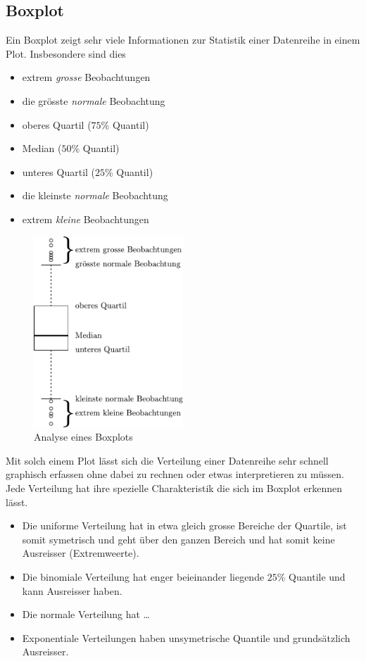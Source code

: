 \subsection{Boxplot}
Ein Boxplot zeigt sehr viele Informationen zur Statistik einer 
Datenreihe in einem Plot. Insbesondere sind dies
\begin{itemize}
	\item extrem \emph{grosse} Beobachtungen
	\item die grösste \emph{normale} Beobachtung
	\item oberes Quartil ($75$\% Quantil)
	\item Median ($50$\% Quantil)
	\item unteres Quartil ($25$\% Quantil)
	\item die kleinste \emph{normale} Beobachtung
	\item extrem \emph{kleine} Beobachtungen
\end{itemize}

\begin{figure}[h!]
	\centering
	\includegraphics[width=0.5\textwidth]{boxplot.pdf}
	\caption{Analyse eines Boxplots}
\end{figure}

\noindent
Mit solch einem Plot lässt sich die Verteilung einer Datenreihe sehr
schnell graphisch erfassen ohne dabei zu rechnen oder etwas 
interpretieren zu müssen. Jede Verteilung hat ihre spezielle 
Charakteristik die sich im Boxplot erkennen lässt.
\begin{itemize}
	\item Die uniforme Verteilung hat in etwa gleich grosse Bereiche
		der Quartile, ist somit symetrisch und geht über den 
		ganzen Bereich und hat somit keine Ausreisser 
		(Extremweerte).
	\item Die binomiale Verteilung hat enger beieinander liegende
		$25$\% Quantile und kann Ausreisser haben.
	\item Die normale Verteilung hat \dots
	\item Exponentiale Verteilungen haben unsymetrische Quantile
		und grundsätzlich Ausreisser.
\end{itemize}





